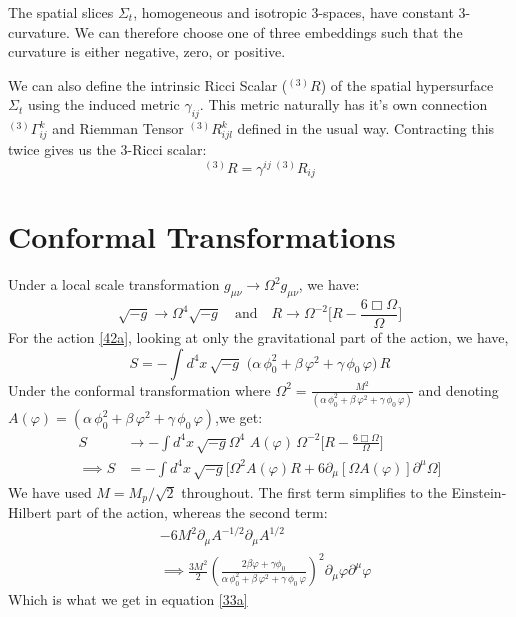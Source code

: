 \documentclass[aps,prd,reprint,preprintnumbers,showpacs,floatfix,nofootinbib,superscript address]{revtex4-2}
\begin{document}

The spatial slices $\Sigma_t$, homogeneous and isotropic 3-spaces, have constant 3-curvature. We can therefore choose one of three embeddings such that the curvature is either negative, zero, or positive. 

We can also define the intrinsic Ricci Scalar (${}^{(3)}R$) of the spatial hypersurface $\Sigma_t$ using the induced metric $\gamma_{ij}$. This metric naturally has it's own connection ${}^{(3)}\Gamma_{ij}^k$ and Riemman Tensor ${}^{(3)}R_{ijl}^k$ defined in the usual way. Contracting this twice gives us the 3-Ricci scalar:
\begin{equation}
    {}^{(3)}R = \gamma^{ij} \,{}^{(3)}R_{ij}
\end{equation}


\section{Conformal Transformations} \label{Conformal Transformations}

Under a local scale transformation $g_{\mu\nu} \rightarrow \Omega^2 g_{\mu\nu} $, we have:
\[
 \sqrt{-g} \rightarrow \Omega^{4} \sqrt{-g} \quad\text{and}\quad R\rightarrow\Omega^{-2}\Big[R-\frac{6\Box\Omega}{\Omega} \Big]
\]
For the action \ref{42a}, looking at only the gravitational part of the action, we have,
\begin{equation}
    S = -\int d^4x\,\sqrt{-g}\, 
  \,\bigl(\alpha\,\phi_0^2 + \beta\,\varphi^2 + \gamma\,\phi_0\,\varphi\bigr)\,R
\end{equation}
Under the conformal transformation where $ \Omega^2 = \frac{M^2}{(\alpha\,\phi_0^2+\beta\,\varphi^2+\gamma\,\phi_0\,\varphi)}$ and denoting $A(\varphi) = (\alpha\,\phi_0^2+\beta\,\varphi^2+\gamma\,\phi_0\,\varphi)$,we get:
\begin{align}
    S &\rightarrow -\int d^4x\,\sqrt{-g} \Omega^{4}\, 
  \,A(\varphi)\, \Omega^{-2}\Big[R-\frac{6\Box\Omega}{\Omega} \Big] \nonumber \\
  \implies S &= - \int d^4x\,\sqrt{-g} \Big[ \Omega^2 A(\varphi) R + 6 \partial_\mu[\Omega A(\varphi)] \partial^\mu\Omega \Big]
\end{align}
We have used $M = M_p/\sqrt{2}$ throughout. The first term simplifies to the Einstein-Hilbert part of the action, whereas the second term:
\begin{align}
    &-6M^2 \partial_\mu A^{-1/2} \partial_\mu A^{1/2} \nonumber \\
    &\implies \frac{3M^2}{2} \left( \frac{2\beta \varphi + \gamma\phi_0}{\alpha\,\phi_0^2+\beta\,\varphi^2+\gamma\,\phi_0\,\varphi} \right)^2 \partial_\mu \varphi \partial^\mu \varphi
\end{align}
Which is what we get in equation \ref{33a}
\end{document}
